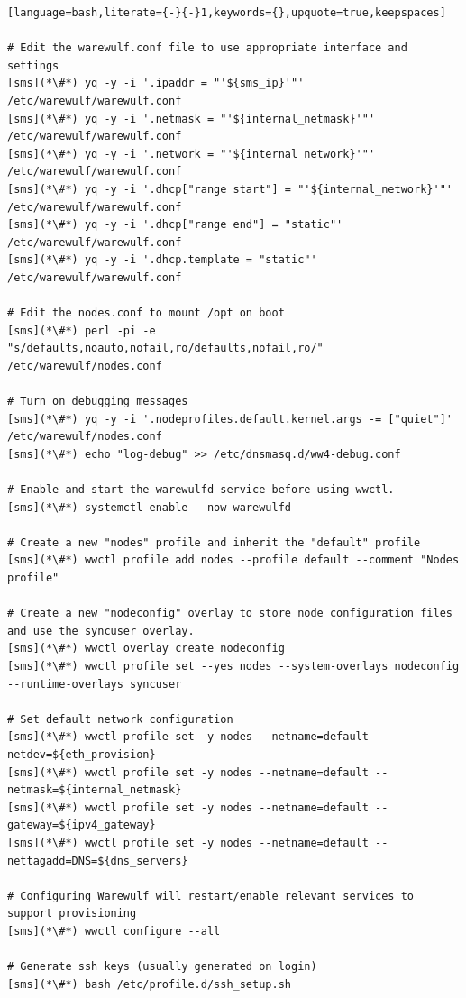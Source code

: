\begin{lstlisting}[language=bash,literate={-}{-}1,keywords={},upquote=true,keepspaces]

# Edit the warewulf.conf file to use appropriate interface and settings
[sms](*\#*) yq -y -i '.ipaddr = "'${sms_ip}'"' /etc/warewulf/warewulf.conf
[sms](*\#*) yq -y -i '.netmask = "'${internal_netmask}'"' /etc/warewulf/warewulf.conf
[sms](*\#*) yq -y -i '.network = "'${internal_network}'"' /etc/warewulf/warewulf.conf
[sms](*\#*) yq -y -i '.dhcp["range start"] = "'${internal_network}'"' /etc/warewulf/warewulf.conf
[sms](*\#*) yq -y -i '.dhcp["range end"] = "static"' /etc/warewulf/warewulf.conf
[sms](*\#*) yq -y -i '.dhcp.template = "static"' /etc/warewulf/warewulf.conf

# Edit the nodes.conf to mount /opt on boot
[sms](*\#*) perl -pi -e "s/defaults,noauto,nofail,ro/defaults,nofail,ro/" /etc/warewulf/nodes.conf

# Turn on debugging messages
[sms](*\#*) yq -y -i '.nodeprofiles.default.kernel.args -= ["quiet"]' /etc/warewulf/nodes.conf
[sms](*\#*) echo "log-debug" >> /etc/dnsmasq.d/ww4-debug.conf

# Enable and start the warewulfd service before using wwctl.
[sms](*\#*) systemctl enable --now warewulfd

# Create a new "nodes" profile and inherit the "default" profile
[sms](*\#*) wwctl profile add nodes --profile default --comment "Nodes profile"

# Create a new "nodeconfig" overlay to store node configuration files and use the syncuser overlay.
[sms](*\#*) wwctl overlay create nodeconfig
[sms](*\#*) wwctl profile set --yes nodes --system-overlays nodeconfig --runtime-overlays syncuser

# Set default network configuration
[sms](*\#*) wwctl profile set -y nodes --netname=default --netdev=${eth_provision}
[sms](*\#*) wwctl profile set -y nodes --netname=default --netmask=${internal_netmask}
[sms](*\#*) wwctl profile set -y nodes --netname=default --gateway=${ipv4_gateway}
[sms](*\#*) wwctl profile set -y nodes --netname=default --nettagadd=DNS=${dns_servers}

# Configuring Warewulf will restart/enable relevant services to support provisioning
[sms](*\#*) wwctl configure --all

# Generate ssh keys (usually generated on login)
[sms](*\#*) bash /etc/profile.d/ssh_setup.sh
\end{lstlisting}
